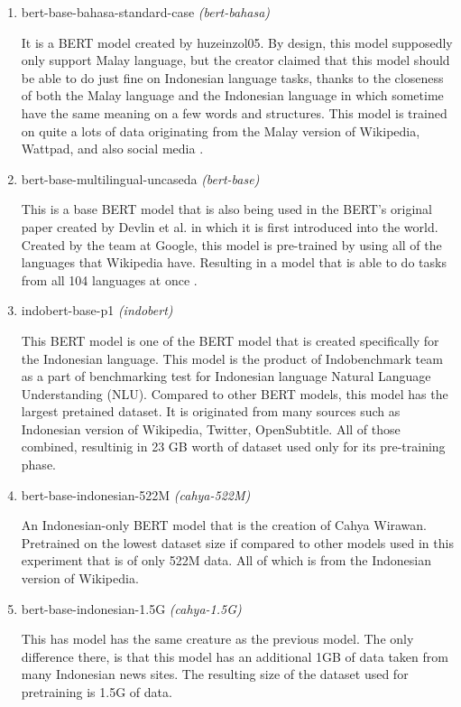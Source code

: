 \begin{enumerate}
  \item bert-base-bahasa-standard-case \textit{(bert-bahasa)}

        It is a BERT model created by huzeinzol05. By design, this model supposedly only support Malay language, but the creator claimed that this model should be able to do just fine on Indonesian language tasks, thanks to the closeness of both the Malay language and the Indonesian language in which sometime have the same meaning on a few words and structures. This model is trained on quite a lots of data originating from the Malay version of Wikipedia, Wattpad, and also social media \cite{Malaya}.

  \item bert-base-multilingual-uncaseda \textit{(bert-base)}

        This is a base BERT model that is also being used in the BERT's original paper created by Devlin et al. in which it is first introduced into the world. Created by the team at Google, this model is pre-trained by using all of the languages that Wikipedia have. Resulting in a model that is able to do tasks from all 104 languages at once \cite{devlin2019bert}.

  \item indobert-base-p1 \textit{(indobert)}

        This BERT model is one of the BERT model that is created specifically for the Indonesian language. This model is the product of Indobenchmark team as a part of benchmarking test for Indonesian language Natural Language Understanding (NLU). Compared to other BERT models, this model has the largest pretained dataset. It is originated from many sources such as Indonesian version of Wikipedia, Twitter, OpenSubtitle. All of those combined, resultinig in 23 GB worth of dataset used only for its pre-training phase.

  \item bert-base-indonesian-522M \textit{(cahya-522M)}

        An Indonesian-only BERT model that is the creation of Cahya Wirawan. Pretrained on the lowest dataset size if compared to other models used in this experiment that is of only 522M data. All of which is from the Indonesian version of Wikipedia.

  \item bert-base-indonesian-1.5G \textit{(cahya-1.5G)}

        This has model has the same creature as the previous model. The only difference there, is that this model has an additional 1GB of data taken from many Indonesian news sites. The resulting size of the dataset used for pretraining is 1.5G of data.

\end{enumerate}

